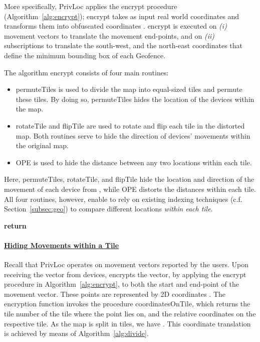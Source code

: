 \documentclass{llncs}
\newcommand\sol{{\sf PrivLoc}}
\begin{document}
More specifically, \sol{} applies the {\sf encrypt} procedure (Algorithm~\ref{alg:encrypt}); {\sf encrypt} takes as input real world coordinates  and transforms them into obfuscated coordinates .
{\sf encrypt} is executed on \emph{(i)} movement vectors to translate the movement end-points, and on \emph{(ii)} subscriptions to translate the south-west, and the north-east coordinates that define the minimum bounding box of each Geofence.

The algorithm {\sf encrypt} consists of four main routines:
\begin{itemize}
\item {\sf permuteTiles} is used to divide the map into equal-sized tiles and permute these tiles. By doing so, {\sf permuteTiles} hides the location of the devices within the map.
\item {\sf rotateTile} and {\sf flipTile} are used to rotate and flip each tile in the distorted map. Both routines serve to hide the direction of devices' movements within the original map.
\item {\sf OPE} is used to hide the distance between any two locations within each tile.
\end{itemize}

Here, {\sf permuteTiles}, {\sf rotateTile}, and {\sf flipTile} hide the location and direction of the movement of each device from , while {\sf OPE} distorts the distances within each tile.
All four routines, however, enable  to rely on existing indexing techniques (c.f. Section~\ref{subsec:geo}) to compare different locations \emph{within each tile}. 


\begin{algorithm}[t]
\caption{Coordinate Encryption in \sol}
\label{alg:encrypt}
\begin{algorithmic}[1]
	\State 
  \State 
	\State 
	\State 
	\State 
	\State 
	\State 
	\State \textbf{return} 
    \EndProcedure
\end{algorithmic}
\end{algorithm}

\paragraph{\underline{Hiding Movements within a Tile}\\}

Recall that \sol{} operates on movement vectors reported by the users.
Upon receiving the vector from devices,  encrypts the vector, by applying the
{\sf encrypt} procedure in Algorithm~\ref{alg:encrypt}, to both the start and end-point of the movement vector. These points are represented by 2D coordinates . The encryption function
invokes the procedure {\sf coordinatesOnTile}, which returns the tile number  of the tile where the point  lies on, and the relative
coordinates  on the respective tile. As the map is split in  tiles, we have . This coordinate translation is achieved by means of Algorithm~\ref{alg:divide}.
\end{document}
